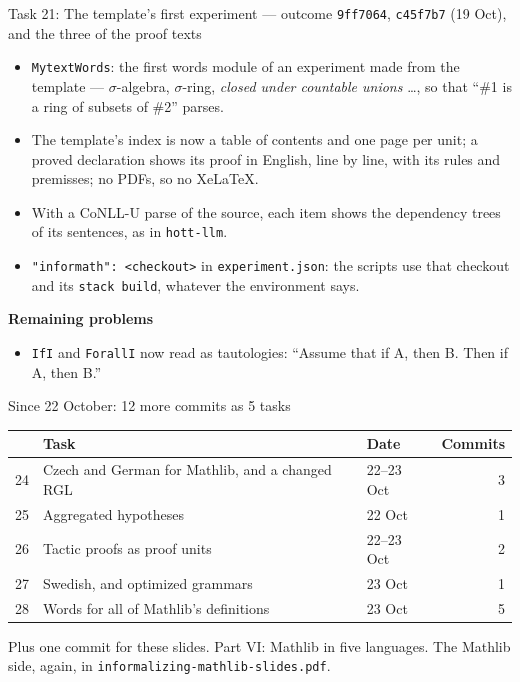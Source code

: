 \documentclass[10pt,aspectratio=169]{beamer}
\newcommand{\commit}[1]{\texttt{\footnotesize #1}}
\begin{document}
\begin{frame}{Task 21: The template's first experiment --- outcome}
  \commit{9ff7064}, \commit{c45f7b7} (19 Oct), and the three of the proof texts
  \begin{itemize}\small
    \item \texttt{MytextWords}: the first words module of an experiment made from the
          template --- $\sigma$-algebra, $\sigma$-ring,
          \emph{closed under countable unions} \dots, so that ``\#1 is a ring of
          subsets of \#2'' parses.
    \item The template's index is now a table of contents and one page per unit; a
          proved declaration shows its proof in English, line by line, with its
          rules and premisses; no PDFs, so no XeLaTeX.
    \item With a CoNLL-U parse of the source, each item shows the dependency trees of
          its sentences, as in \texttt{hott-llm}.
    \item \texttt{"informath": <checkout>} in \texttt{experiment.json}: the scripts use
          that checkout and its \texttt{stack build}, whatever the environment says.
  \end{itemize}
  \textbf{Remaining problems}
  \begin{itemize}\small
    \item \texttt{IfI} and \texttt{ForallI} now read as tautologies: ``Assume that if
          A, then B. Then if A, then B.''
  \end{itemize}
\end{frame}

\begin{frame}{Since 22 October: 12 more commits as 5 tasks}
  \footnotesize
  \begin{tabular}{rllr}
    \toprule
    & \textbf{Task} & \textbf{Date} & \textbf{Commits} \\
    \midrule
    24 & Czech and German for Mathlib, and a changed RGL & 22--23 Oct & 3 \\
    25 & Aggregated hypotheses & 22 Oct & 1 \\
    26 & Tactic proofs as proof units & 22--23 Oct & 2 \\
    27 & Swedish, and optimized grammars & 23 Oct & 1 \\
    28 & Words for all of Mathlib's definitions & 23 Oct & 5 \\
    \bottomrule
  \end{tabular}

  \vspace{0.5em}
  Plus one commit for these slides. \quad Part VI: Mathlib in five languages.
  \quad The Mathlib side, again, in \texttt{informalizing-mathlib-slides.pdf}.
\end{frame}
\end{document}
